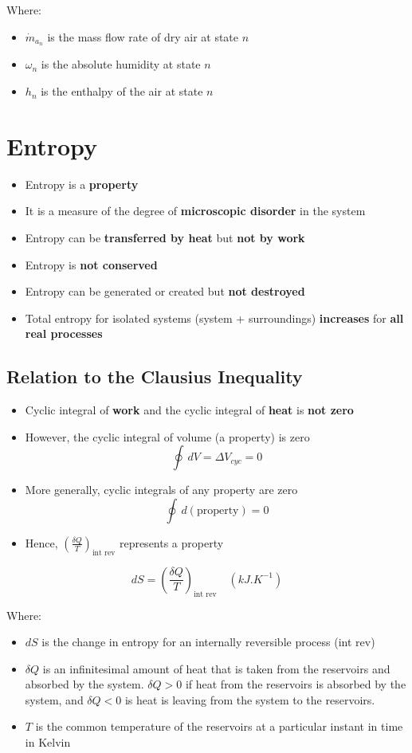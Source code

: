 \documentclass[11pt]{article}
\begin{document}
Where:
\begin{itemize}
\item \(\dot{m}_{a_n}\) is the mass flow rate of dry air at state \(n\)
\item \(\omega_n\) is the absolute humidity at state \(n\)
\item \(h_n\) is the enthalpy of the air at state \(n\)
\end{itemize}

 \newpage
\section{Entropy}
\label{sec:org2e91094}
\begin{itemize}
\item Entropy is a \textbf{property}
\item It is a measure of the degree of \textbf{microscopic disorder} in the system
\item Entropy can be \textbf{transferred by heat} but \textbf{not by work}
\item Entropy is \textbf{not conserved}
\item Entropy can be generated or created but \textbf{not destroyed}
\item Total entropy for isolated systems (system + surroundings) \textbf{increases} for \textbf{all real processes}
\end{itemize}
\subsection{Relation to the Clausius Inequality}
\label{sec:org9faa512}
\begin{itemize}
\item Cyclic integral of \textbf{work} and the cyclic integral of \textbf{heat} is \textbf{not zero}
\item However, the cyclic integral of volume (a property) is zero
\[\oint \, dV = \Delta V_{cyc} = 0\]
\item More generally, cyclic integrals of any property are zero
\[\oint \, d(\text{property}) = 0\]
\item Hence, \(\left(\frac{\delta Q}{T} \right)_{\text{int rev}}\) represents a property
\end{itemize}

\[dS = \left(\frac{\delta Q}{T} \right)_{\text{int rev}} \quad \left(\unit{kJ.K^{-1}}\right)\]

Where:
\begin{itemize}
\item \(dS\) is the change in entropy for an internally reversible process (int rev)
\item \(\delta Q\) is an infinitesimal amount of heat that is taken from the reservoirs and absorbed by the system. \(\delta Q > 0\) if heat from the reservoirs is absorbed by the system, and \(\delta Q < 0\) is heat is leaving from the system to the reservoirs.
\item \(T\) is the common temperature of the reservoirs at a particular instant in time in Kelvin
\end{itemize}
\end{document}
